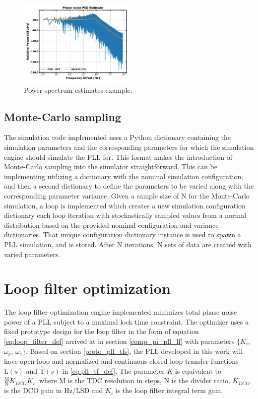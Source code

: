 	\begin{figure}[htb!]
		\center\includegraphics[width=0.5\textwidth, angle=0]{figs/psd_estimate.pdf}
		\caption{Power spectrum estimates example.}
		\label{fig:psd_est}
	\end{figure}
	\FloatBarrier

\subsection{Monte-Carlo sampling}
The simulation code implemented uses a Python dictionary containing the simulation parameters and the corresponding parameters for which the simulation engine should simulate the PLL for. This format makes the introduction of Monte-Carlo sampling into the simulator straightforward. This can be implementing utilizing a dictionary with the nominal simulation configuration, and then a second dictionary to define the parameters to be varied along with the corresponding parameter variance. Given a sample size of N for the Monte-Carlo simulation, a loop is implemented which creates a new simulation configuration dictionary each loop iteration with stochastically sampled values from a normal distribution based on the provided nominal configuration and variance dictionaries. That unique configuration dictionary instance is used to spawn a PLL simulation, and is stored. After N iterations, N sets of data are created with varied parameters.



\pagebreak
\section{Loop filter optimization}\label{methods_lf_opt}
The loop filter optimization engine implemented  minimizes total phase noise power of a PLL subject to a maximal lock time constraint. The optimizer uses a fixed prototype design for the loop filter in the form of equation \ref{eq:loop_filter_def} arrived at in section \ref{comp_pi_pll_lf} with parameters $\{K_i$, $\omega_p$, $\omega_z\}$. Based on section \ref{proto_pll_tfs}, the PLL developed in this work will have open loop and normalized and continuous closed loop transfer functions $\mathrm{L}(s)$ and $\mathrm{\hat{T}}(s)$ in \ref{eq:pll_tf_def}. The parameter $K$ is equivalent to $\frac{\mathrm{M}}{\mathrm{N}}K_{DCO}K_i$, where M is the TDC resolution in steps, N is the divider ratio, $K_{DCO}$ is the DCO gain in Hz/LSD and $K_i$ is the loop filter integral term gain. 

